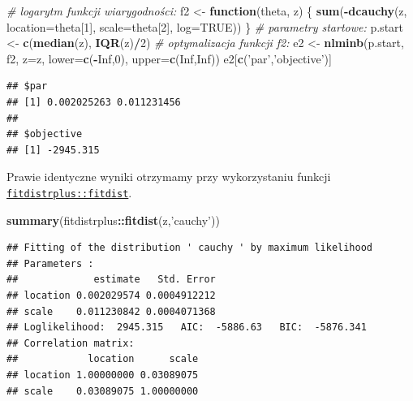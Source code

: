 \documentclass[polish,]{book}
\newenvironment{Shaded}{\begin{snugshade}}{\end{snugshade}}
\newcommand{\CommentTok}[1]{\textcolor[rgb]{0.56,0.35,0.01}{\textit{#1}}}
\newcommand{\ControlFlowTok}[1]{\textcolor[rgb]{0.13,0.29,0.53}{\textbf{#1}}}
\newcommand{\DataTypeTok}[1]{\textcolor[rgb]{0.13,0.29,0.53}{#1}}
\newcommand{\DecValTok}[1]{\textcolor[rgb]{0.00,0.00,0.81}{#1}}
\newcommand{\KeywordTok}[1]{\textcolor[rgb]{0.13,0.29,0.53}{\textbf{#1}}}
\newcommand{\NormalTok}[1]{#1}
\newcommand{\OperatorTok}[1]{\textcolor[rgb]{0.81,0.36,0.00}{\textbf{#1}}}
\newcommand{\OtherTok}[1]{\textcolor[rgb]{0.56,0.35,0.01}{#1}}
\newcommand{\StringTok}[1]{\textcolor[rgb]{0.31,0.60,0.02}{#1}}
\begin{document}
\begin{Shaded}
\begin{Highlighting}[]
\CommentTok{# logarytm funkcji wiarygodności:}
\NormalTok{f2 <-}\StringTok{ }\ControlFlowTok{function}\NormalTok{(theta, z) \{}
  \KeywordTok{sum}\NormalTok{(}\OperatorTok{-}\KeywordTok{dcauchy}\NormalTok{(z, }\DataTypeTok{location=}\NormalTok{theta[}\DecValTok{1}\NormalTok{], }\DataTypeTok{scale=}\NormalTok{theta[}\DecValTok{2}\NormalTok{], }\DataTypeTok{log=}\OtherTok{TRUE}\NormalTok{))}
\NormalTok{  \}}
\CommentTok{# parametry startowe:}
\NormalTok{p.start <-}\StringTok{ }\KeywordTok{c}\NormalTok{(}\KeywordTok{median}\NormalTok{(z), }\KeywordTok{IQR}\NormalTok{(z)}\OperatorTok{/}\DecValTok{2}\NormalTok{)}
\CommentTok{# optymalizacja funkcji f2:}
\NormalTok{e2 <-}\StringTok{ }\KeywordTok{nlminb}\NormalTok{(p.start, f2, }\DataTypeTok{z=}\NormalTok{z, }\DataTypeTok{lower=}\KeywordTok{c}\NormalTok{(}\OperatorTok{-}\OtherTok{Inf}\NormalTok{,}\DecValTok{0}\NormalTok{), }\DataTypeTok{upper=}\KeywordTok{c}\NormalTok{(}\OtherTok{Inf}\NormalTok{,}\OtherTok{Inf}\NormalTok{))}
\NormalTok{e2[}\KeywordTok{c}\NormalTok{(}\StringTok{'par'}\NormalTok{,}\StringTok{'objective'}\NormalTok{)]}
\end{Highlighting}
\end{Shaded}

\begin{verbatim}
## $par
## [1] 0.002025263 0.011231456
## 
## $objective
## [1] -2945.315
\end{verbatim}

Prawie identyczne wyniki otrzymamy przy wykorzystaniu funkcji \href{https://rdrr.io/cran/fitdistrplus/man/fitdist.html}{\texttt{fitdistrplus::fitdist}}.

\begin{Shaded}
\begin{Highlighting}[]
\KeywordTok{summary}\NormalTok{(fitdistrplus}\OperatorTok{::}\KeywordTok{fitdist}\NormalTok{(z,}\StringTok{'cauchy'}\NormalTok{))}
\end{Highlighting}
\end{Shaded}

\begin{verbatim}
## Fitting of the distribution ' cauchy ' by maximum likelihood 
## Parameters : 
##             estimate   Std. Error
## location 0.002029574 0.0004912212
## scale    0.011230842 0.0004071368
## Loglikelihood:  2945.315   AIC:  -5886.63   BIC:  -5876.341 
## Correlation matrix:
##            location      scale
## location 1.00000000 0.03089075
## scale    0.03089075 1.00000000
\end{verbatim}
\end{document}
